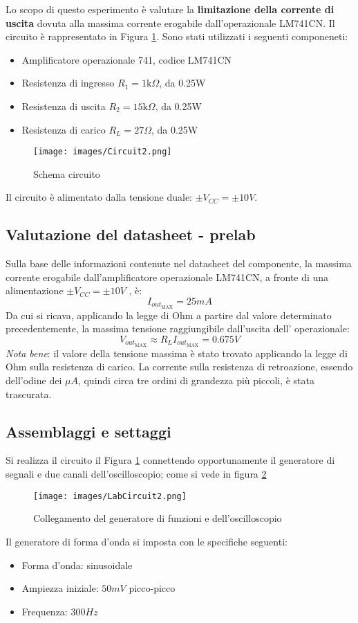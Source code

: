 Lo scopo di questo esperimento è valutare la \textbf{limitazione della corrente di uscita} dovuta alla massima corrente erogabile dall’operazionale LM741CN. Il circuito è rappresentato in Figura \ref{fig:Circuito2}. Sono stati utilizzati i seguenti componeneti:
\begin{itemize}
    \item Amplificatore operazionale 741, codice LM741CN
    \item Resistenza di ingresso $R_1=1\text{k}\Omega$, da 0.25W 
    \item Resistenza di uscita $R_2=15\text{k}\Omega$, da 0.25W
    \item Resistenza di carico $R_L=27\Omega$, da 0.25W
\end{itemize}
\begin{figure}[h]
    \centering
    \texttt{[image: images/Circuit2.png]}
    \caption{Schema circuito}
    \label{fig:Circuito2}
\end{figure}
Il circuito è alimentato dalla tensione duale: $\pm V_{CC}=\pm 10V$.
\subsection{Valutazione del datasheet - prelab}
Sulla base delle informazioni contenute nel datasheet del componente, la massima corrente erogabile dall'amplificatore operazionale LM741CN, a fronte di una alimentazione $\pm V_{CC}=\pm 10V$ , è:
\begin{equation*}
    I_{{out}_{\text{MAX}}}=25mA
\end{equation*}
Da cui si ricava, applicando la legge di Ohm a partire dal valore determinato precedentemente, la massima tensione raggiungibile dall'uscita dell' operazionale:
\begin{equation*}
    V_{{out}_{\text{MAX}}}\approx R_LI_{{out}_{\text{MAX}}}= 0.675V
\end{equation*}
\textit{Nota bene}: il valore della tensione massima è stato trovato applicando la legge di Ohm sulla resistenza di carico. La corrente sulla resistenza di retroazione, essendo dell’odine dei $\mu A$, quindi circa tre ordini di grandezza più piccoli, è stata trascurata.
\subsection{Assemblaggi e settaggi}
Si realizza il circuito il Figura \ref{fig:Circuito2} connettendo opportunamente il generatore di segnali e due canali dell'oscilloscopio; come si vede in figura \ref{fig:LabCircuit2}
\begin{figure}[H]
    \centering
    \texttt{[image: images/LabCircuit2.png]}
    \caption{Collegamento del generatore di funzioni e dell'oscilloscopio}
    \label{fig:LabCircuit2}
\end{figure}
Il generatore di forma d'onda si imposta con le specifiche seguenti:
\begin{itemize}
    \item Forma d'onda: sinusoidale
    \item Ampiezza iniziale: $50mV$ picco-picco
    \item Frequenza: $300Hz$
\end{itemize}
